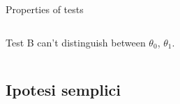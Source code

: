 \documentclass[asd-beamer.tex]{subfiles}
\begin{document}
\begin{frame}{Properties of tests}
\begin{columns}[T]
\begin{column}{0.5\textwidth}
Test B can't distinguish between $\theta_0$, $\theta_1$.
	\end{column}
\end{columns}
\end{frame}

\subsection{Ipotesi semplici}
\end{document}
